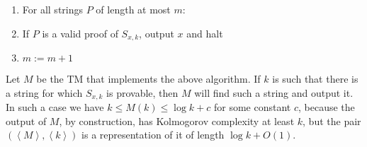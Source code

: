 \documentclass[10pt,landscape]{article}
\newcommand{\encode}[1]{\left\langle #1 \right\rangle}
\begin{document}
\begin{multicols*}{3}
\begin{enumerate}
\item \-\hspace{1cm} For all strings $P$ of length at most $m$:
\item \-\hspace{1.5cm} If $P$ is a valid proof of $S_{x,k}$, output $x$ and halt
\item \-\hspace{0.5cm} $m := m+1$
\end{enumerate}
Let $M$ be the TM that implements the above algorithm. If $k$ is such that there is a string for which $S_{x,k}$ is provable, then $M$ will find such a string and output it. In such a case we have $k \le M(k) \le \log k + c$ for some constant $c$, because the output of $M$, by construction, has Kolmogorov complexity at least $k$, but the pair $(\encode{M}, \encode{k})$ is a representation of it of length $\log k + O(1)$. 


\end{multicols*}
\end{document}
